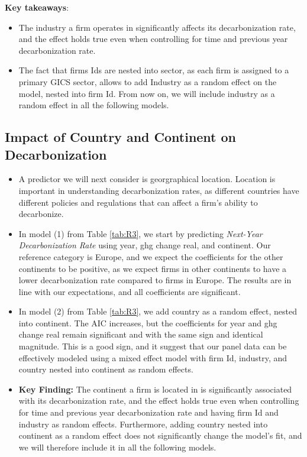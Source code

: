 \textbf{Key takeaways}:
\begin{itemize}
    \item The industry a firm operates in significantly affects its decarbonization rate, and the effect holds true even when controlling for time and previous year decarbonization rate.
    \item The fact that firms Ids are nested into sector, as each firm is assigned to a primary GICS sector, allows to add Industry as a random effect on the model, nested into firm Id. From now on, we will include industry as a random effect in all the following models.
\end{itemize}



\subsection{Impact of Country and Continent on Decarbonization}
\begin{itemize}
    \item A predictor we will next consider is georgraphical location. Location is important in understanding decarbonization rates, as different countries have different policies and regulations that can affect a firm's ability to decarbonize. 
    \item In model (1) from Table \ref{tab:R3}, we start by predicting \textit{Next-Year Decarbonization Rate} using year, ghg change real, and continent. Our reference category is Europe, and we expect the coefficients for the other continents to be positive, as we expect firms in other continents to have a lower decarbonization rate compared to firms in Europe. The results are in line with our expectations, and all coefficients are significant.
    \item In model (2) from Table \ref{tab:R3}, we add country as a random effect, nested into continent. The AIC increases, but the coefficients for year and ghg change real remain significant and with the same sign and identical magnitude. This is a good sign, and it suggest that our panel data can be effectively modeled using a mixed effect model with firm Id, industry, and country nested into continent as random effects.
    \item \textbf{Key Finding:} The continent a firm is located in is significantly associated with its decarbonization rate, and the effect holds true even when controlling for time and previous year decarbonization rate and having firm Id and industry as random effects. Furthermore, adding country nested into continent as a random effect does not significantly change the model's fit, and we will therefore include it in all the following models.
\end{itemize}
 


